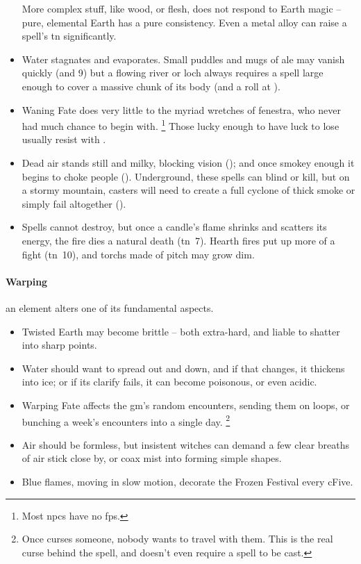 \begin{multicols}{2}
\begin{itemize}
  More complex stuff, like wood, or flesh, does not respond to Earth magic -- pure, elemental Earth has a pure consistency.
  Even a metal alloy can raise a spell's \gls{tn} significantly.
  \item
  Water stagnates and evaporates.
  Small puddles and mugs of ale may vanish quickly (\tn[6] and 9)
  but a flowing river or loch always requires a spell large enough to cover a massive chunk of its body (and a roll at \tn[12]).
  \item
  Waning Fate does very little to the myriad wretches of \gls{fenestra}, who never had much chance to begin with.%
  \footnote{Most \glspl{npc} have no \glspl{fp}.}
  Those lucky enough to have luck to lose usually resist with .
  \item
  Dead air stands still and milky, blocking vision (\tn[7]);
  and once smokey enough it begins to choke people (\tn[9]).
  Underground, these spells can blind or kill, but on a stormy mountain, casters will need to create a full cyclone
  of thick smoke or simply fail altogether (\tn[16]).
  \item
  Spells cannot destroy, but once a candle's flame shrinks and scatters its energy, the fire dies a natural death (\gls{tn}~7).
  Hearth fires put up more of a fight (\gls{tn}~10), and \glspl{torch} made of pitch may grow dim.
\end{itemize}

\paragraph{Warping}
an element alters one of its fundamental aspects.

\begin{itemize}
  \item
  Twisted Earth may become brittle -- both extra-hard, and liable to shatter into sharp points.
  \item
  Water should want to spread out and down, and if that changes, it thickens into ice;
  or if its clarify fails, it can become poisonous, or even acidic.
  \item
  Warping Fate affects the \gls{gm}'s random encounters, sending them on loops, or bunching a week's encounters into a single day.%
  \footnote{Once  curses someone, nobody wants to travel with them.  This is the real curse behind the spell, and doesn't even require a spell to be cast.}
  \item
  Air should be formless, but insistent witches can demand a few clear breaths of air stick close by, or coax mist into forming simple shapes.
  \item
  Blue flames, moving in slow motion, decorate the Frozen Festival every \gls{cFive}.
\end{itemize}


\end{multicols}
